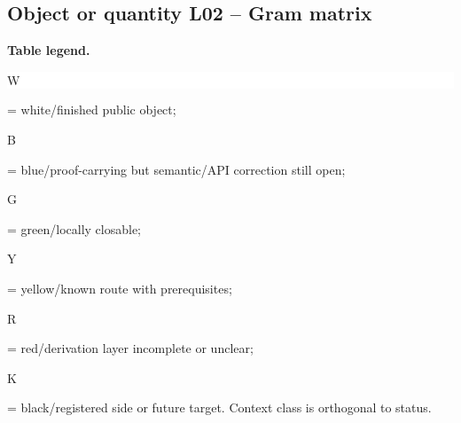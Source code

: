 \subsection*{Object or quantity L02 -- Gram matrix}
\hypertarget{objproof:L02}{}
\par\smallskip\noindent\begin{minipage}{0.99\linewidth}\footnotesize\raggedright\textbf{Table legend.} \colorbox{white}{\strut W} = white/finished public object; \colorbox{cyan!20}{\strut B} = blue/proof-carrying but semantic/API correction still open; \colorbox{green!18}{\strut G} = green/locally closable; \colorbox{yellow!25}{\strut Y} = yellow/known route with prerequisites; \colorbox{red!20}{\strut R} = red/derivation layer incomplete or unclear; \colorbox{black!18}{\strut K} = black/registered side or future target. Context class is orthogonal to status.\end{minipage}\par\vspace{0.25em}
